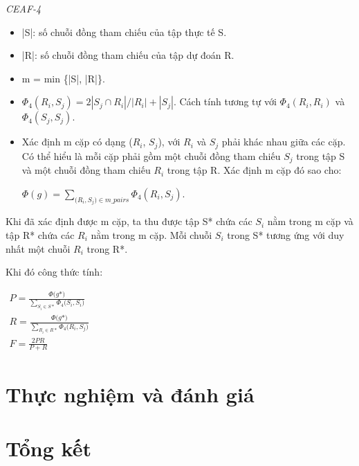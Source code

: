 \documentclass[12pt]{extarticle}
\begin{document}
					\textit{CEAF-4}
				\begin{itemize}
					\item{|S|: số chuỗi đồng tham chiếu của tập thực tế S.}
					\item{|R|: số chuỗi đồng tham chiếu của tập dự đoán R.}
					\item{m = min \{|S|, |R|\}.}
					\item{$\Phi_4(R_i,S_j) = 2 |S_j \cap R_i|/ |R_i| + |S_j|$. Cách tính tương tự với $\Phi_4(R_i,R_i)$ và $\Phi_4(S_j,S_j)$.}  
					\item{Xác định m cặp có dạng ($R_i$, $S_j$), với $R_i$ và $S_j$ phải khác nhau giữa các cặp. Có thể hiểu là mỗi cặp phải gồm một chuỗi đồng tham chiếu $S_j$ trong tập S và một chuỗi đồng tham chiếu $R_i$ trong tập R. Xác định m cặp đó sao cho: 
					\begin{center}
						$\Phi(g) = \sum_{\big(R_i,S_j) \in m\_pairs} \Phi_4(R_i,S_j)$.
					\end{center}}
				\end{itemize}
				\par Khi đã xác định được m cặp, ta thu được tập S* chứa các $S_i$ nằm trong m cặp và tập R* chứa các $R_i$ nằm trong m cặp. Mỗi chuỗi $S_i$ trong S* tương ứng với duy nhất một chuỗi $R_i$ trong R*.
				\par Khi đó công thức tính:						
					\begin{center}
						$\begin{aligned}
							P = \frac{\Phi \big(g*)}{\sum_{S_i \in S*}\Phi_4 \big(S_i, S_i)}
						\end{aligned}$
						\\
						$\begin{aligned}
							R = \frac{\Phi \big(g*)}{\sum_{R_i \in R*}\Phi_4 \big(R_i, S_j)}
						\end{aligned}$
						\\
						$\begin{aligned}
							F = \frac{2PR}{P+R}
						\end{aligned}$
					\end{center}

	\section{Thực nghiệm và đánh giá}

	\section{Tổng kết}		
\end{document}
